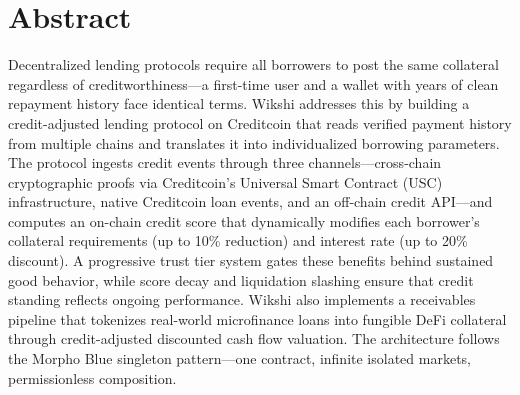 \documentclass[11pt,a4paper]{article}
\begin{document}
\begin{titlepage}
\end{titlepage}

\newpage
\tableofcontents
\thispagestyle{fancy}
\newpage

\section*{Abstract}

Decentralized lending protocols require all borrowers to post the same collateral regardless of creditworthiness---a first-time user and a wallet with years of clean repayment history face identical terms. Wikshi addresses this by building a credit-adjusted lending protocol on Creditcoin that reads verified payment history from multiple chains and translates it into individualized borrowing parameters. The protocol ingests credit events through three channels---cross-chain cryptographic proofs via Creditcoin's Universal Smart Contract (USC) infrastructure, native Creditcoin loan events, and an off-chain credit API---and computes an on-chain credit score that dynamically modifies each borrower's collateral requirements (up to 10\% reduction) and interest rate (up to 20\% discount). A progressive trust tier system gates these benefits behind sustained good behavior, while score decay and liquidation slashing ensure that credit standing reflects ongoing performance. Wikshi also implements a receivables pipeline that tokenizes real-world microfinance loans into fungible DeFi collateral through credit-adjusted discounted cash flow valuation. The architecture follows the Morpho Blue singleton pattern---one contract, infinite isolated markets, permissionless composition.
\end{document}

